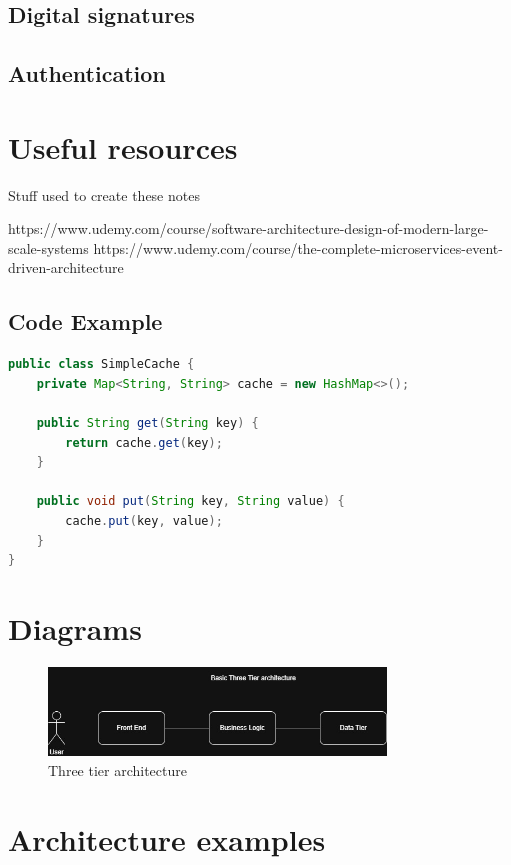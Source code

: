 \documentclass[a4paper, 11pt]{book}
\begin{document}
    \section{Digital signatures}


    \section{Authentication}


    \chapter{Useful resources}
    Stuff used to create these notes

    https://www.udemy.com/course/software-architecture-design-of-modern-large-scale-systems
    https://www.udemy.com/course/the-complete-microservices-event-driven-architecture

    \newpage



    \section{Code Example}
    \begin{lstlisting}[language=Java, caption=Java Code for a Simple Cache]
public class SimpleCache {
    private Map<String, String> cache = new HashMap<>();

    public String get(String key) {
        return cache.get(key);
    }

    public void put(String key, String value) {
        cache.put(key, value);
    }
}
    \end{lstlisting}


    \chapter{Diagrams}

    \begin{figure}[h]
        \centering
        \includegraphics[width=0.8\textwidth]{basic-architecture} %
        \caption{Three tier architecture}
        \label{fig:drawio-diagram}
    \end{figure}


    \chapter{Architecture examples}
\end{document}
